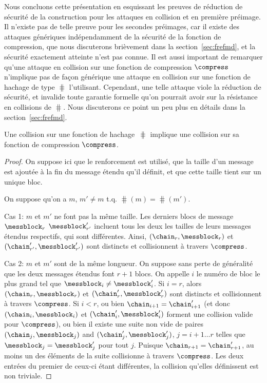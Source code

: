 Nous concluons cette présentation en esquissant les preuves de réduction de sécurité de la construction \merkdam pour les attaques en collision
et en première préimage. Il n'existe pas de telle preuve pour les secondes préimages, car il existe des attaques génériques indépendamment
de la sécurité de la fonction de compression, que nous discuterons brièvement dans la section~\ref{sec:frefmd}, et la sécurité exactement
atteinte n'est pas connue.
Il est aussi important de remarquer qu'une attaque en collision sur une fonction de compression $\compress$ n'implique pas de façon
générique une attaque en collision sur
une fonction de hachage de type \merkdam $\hash$ l'utilisant. Cependant, une telle attaque viole la réduction de sécurité, et invalide toute garantie
formelle qu'on pourrait avoir sur la résistance en collisions de $\hash$. Nous discuterons ce point un peu plus en détails dans la section~\ref{sec:frefmd}.

\begin{prop}
Une collision sur une fonction de hachage \merkdam $\hash$ implique une collision sur sa fonction de compression
$\compress$.
\end{prop}
\begin{proof}
On suppose ici que le renforcement \merkdam est utilisé, que la taille
d'un message est ajoutée à la fin du message étendu qu'il définit, et que cette taille tient sur un unique bloc.

On suppose qu'on a
$m$, $m' \neq m$ t.q. $\hash(m) = \hash(m')$.

Cas 1: $m$ et $m'$ ne font pas la même taille.
Les derniers blocs de message $\messblock_r$
$\messblock'_{r'}$ incluent tous les deux les tailles de leurs messages étendus respectifs, qui sont différentes.
Ainsi,
$(\chain_r,\messblock_r)$ et $(\chain'_{r'}, \messblock'_{r'})$ sont distincts et collisionnent à travers $\compress$.

Cas 2: $m$ et $m'$
sont de la même longueur.
On suppose sans perte de généralité que les deux messages étendus font
$r + 1$ blocs.
On appelle $i$ le numéro de bloc le plus grand tel que
$\messblock_{i} \neq \messblock'_{i}$.
Si
$i = r$, alors $(\chain_r,\messblock_r)$ et $(\chain'_{r}, \messblock'_{r})$
sont distincts et collisionnent à travers
$\compress$.
Si
$i < r$, ou bien $\chain_{i+1} = \chain'_{i+1}$ (et donc $(\chain_i,\messblock_i)$ et $(\chain'_{i}, \messblock'_{i})$
forment une collision valide  pour $\compress$), ou bien il existe une suite non vide de paires $(\chain_j, \messblock_j)$ and $(\chain'_j, \messblock'_j)$,
$j = i+1\ldots r$ telles que $\messblock_j = \messblock'_j$ pour tout $j$.
Puisque $\chain_{r+1} = \chain'_{r+1}$, au moins un des éléments de la suite collisionne à travers
$\compress$. Les deux entrées du premier de ceux-ci étant différentes, la collision qu'elles définissent est non triviale.
\end{proof}

